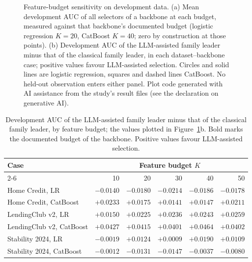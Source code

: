 \documentclass[final,5p,twocolumn]{elsarticle}
\newcommand{\Kfeat}{K}
\begin{document}
\begin{figure}[htbp]
\caption{Feature-budget sensitivity on development data. (a) Mean development AUC of all selectors of a backbone at each budget, measured against that backbone's documented budget (logistic regression $\Kfeat=20$, CatBoost $\Kfeat=40$; zero by construction at those points). (b) Development AUC of the LLM-assisted family leader minus that of the classical family leader, in each dataset--backbone case; positive values favour LLM-assisted selection. Circles and solid lines are logistic regression, squares and dashed lines CatBoost. No held-out observation enters either panel. Plot code generated with AI assistance from the study's result files (see the declaration on generative AI).}
\label{fig:budgets}
\end{figure}

\begin{table}[htbp]
\centering
\footnotesize
\begin{threeparttable}
\caption{Development AUC of the LLM-assisted family leader minus that of the classical family leader, by feature budget; the values plotted in Figure~\ref{fig:budgets}b. Bold marks the documented budget of the backbone. Positive values favour LLM-assisted selection.}
\label{tab:budgets}
\setlength{\tabcolsep}{4pt}
\begin{tabular}{@{}lrrrrr@{}}
\toprule
Case & \multicolumn{5}{c}{Feature budget $\Kfeat$} \\
\cmidrule(l){2-6}
 & 10 & 20 & 30 & 40 & 50 \\
\midrule
Home Credit, LR & $-0.0140$ & $\mathbf{-0.0180}$ & $-0.0214$ & $-0.0186$ & $-0.0178$ \\
Home Credit, CatBoost & $+0.0233$ & $+0.0175$ & $+0.0141$ & $\mathbf{+0.0147}$ & $+0.0211$ \\
LendingClub v2, LR & $+0.0150$ & $\mathbf{+0.0225}$ & $+0.0236$ & $+0.0243$ & $+0.0259$ \\
LendingClub v2, CatBoost & $+0.0427$ & $+0.0415$ & $+0.0401$ & $\mathbf{+0.0464}$ & $+0.0402$ \\
Stability 2024, LR & $-0.0019$ & $\mathbf{+0.0124}$ & $+0.0009$ & $+0.0190$ & $+0.0109$ \\
Stability 2024, CatBoost & $-0.0012$ & $-0.0131$ & $-0.0147$ & $\mathbf{-0.0037}$ & $-0.0080$ \\
\bottomrule
\end{tabular}
\end{threeparttable}
\end{table}
\end{document}
